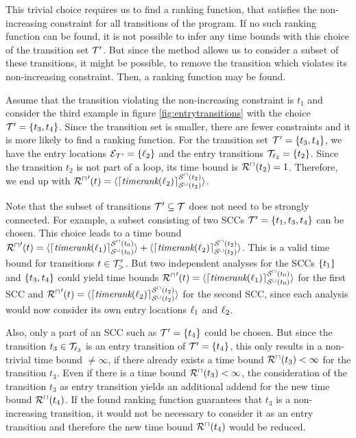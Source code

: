 This trivial choice requires us to find a ranking function, that satisfies the non-increasing constraint for all transitions of the program.
If no such ranking function can be found, it is not possible to infer any time bounds with this choice of the transition set $\mathcal{T}'$.
But since the method allows us to consider a subset of these transitions, it might be possible, to remove the transition which violates its non-increasing constraint.
Then, a ranking function may be found.

Assume that the transition violating the non-increasing constraint is $t_1$ and consider the third example in figure \ref{fig:entrytransitions} with the choice $\mathcal{T}' = \lbrace t_3, t_4 \rbrace$.
Since the transition set is smaller, there are fewer constraints and it is more likely to find a ranking function.
For the transition set $\mathcal{T}' = \lbrace t_3, t_4 \rbrace$, we have the entry locations $\mathcal{E}_{\mathcal{T}'} = \lbrace \ell_2 \rbrace$ and the entry transitions $\mathcal{T}_{\ell_2} = \lbrace t_2 \rbrace$.
Since the transition $t_2$ is not part of a loop, its time bound is ${\mathcal{R}^\sqcap}(t_2) = 1$.
Therefore, we end up with ${\mathcal{R}^\sqcap}'(t) = \langle\lceil \emph{timerank}(\ell_2) \rceil^{{\mathcal{S}^\sqcap}(t_2)}_{{\mathcal{S}^\sqcup}(t_2)}\rangle$.

Note that the subset of transitions $\mathcal{T}' \subseteq \mathcal{T}$ does not need to be strongly connected.
For example, a subset consisting of two SCCs $\mathcal{T}' = \lbrace t_1, t_3, t_4 \rbrace$ can be chosen.
This choice leads to a time bound ${\mathcal{R}^\sqcap}'(t) = \langle\lceil \emph{timerank}(\ell_1) \rceil^{{\mathcal{S}^\sqcap}(t_0)}_{{\mathcal{S}^\sqcup}(t_0)}\rangle + \langle\lceil \emph{timerank}(\ell_2) \rceil^{{\mathcal{S}^\sqcap}(t_2)}_{{\mathcal{S}^\sqcup}(t_2)}\rangle$.
This is a valid time bound for transitions $t \in \mathcal{T}'_>$.
But two independent analyses for the SCCs $\lbrace t_1 \rbrace$ and $\lbrace t_3, t_4 \rbrace$ could yield time bounds ${\mathcal{R}^\sqcap}'(t) = \langle\lceil \emph{timerank}(\ell_1) \rceil^{{\mathcal{S}^\sqcap}(t_0)}_{{\mathcal{S}^\sqcup}(t_0)}\rangle$ for the first SCC and ${\mathcal{R}^\sqcap}'(t) = \langle\lceil \emph{timerank}(\ell_2) \rceil^{{\mathcal{S}^\sqcap}(t_2)}_{{\mathcal{S}^\sqcup}(t_2)}\rangle$ for the second SCC, since each analysis would now consider its own entry locations $\ell_1$ and $\ell_2$.

Also, only a part of an SCC such as $\mathcal{T}' = \lbrace t_4 \rbrace$ could be chosen.
But since the transition $t_3 \in \mathcal{T}_{\ell_3}$ is an entry transition of $\mathcal{T}' = \lbrace t_4 \rbrace$, this only results in a non-trivial time bound $\neq \infty$, if there already exists a time bound ${\mathcal{R}^\sqcap}(t_3) < \infty$ for the transition $t_3$.
Even if there is a time bound ${\mathcal{R}^\sqcap}(t_3) < \infty$, the consideration of the transition $t_3$ as entry transition yields an additional addend for the new time bound ${\mathcal{R}^\sqcap}(t_4)$.
If the found ranking function guarantees that $t_3$ is a non-increasing transition, it would not be necessary to consider it as an entry transition and therefore the new time bound ${\mathcal{R}^\sqcap}(t_4)$ would be reduced.

